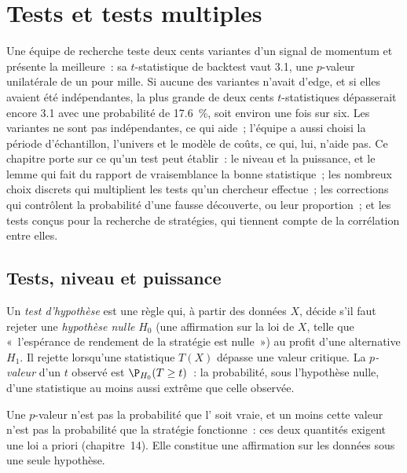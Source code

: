 \chapter{Tests et tests multiples}\label{ch:qm:testing-and-multiple-testing}

Une équipe de recherche teste deux cents variantes d'un signal de momentum et présente la meilleure~: sa $t$-statistique de backtest vaut 3.1,
une $p$-valeur unilatérale de un pour mille. Si aucune des variantes n'avait d'edge, et si elles avaient été indépendantes, la plus grande de
deux cents $t$-statistiques dépasserait encore 3.1 avec une probabilité de 17.6~\%, soit environ une fois sur six. Les variantes ne sont pas
indépendantes, ce qui aide~; l'équipe a aussi choisi la période d'échantillon, l'univers et le modèle de coûts, ce qui, lui, n'aide pas. Ce
chapitre porte sur ce qu'un test peut établir~: le niveau et la puissance, et le lemme qui fait du rapport de vraisemblance la bonne statistique~; les
nombreux choix discrets qui multiplient les tests qu'un chercheur effectue~; les corrections qui contrôlent la probabilité d'une fausse découverte,
ou leur proportion~; et les tests conçus pour la recherche de stratégies, qui tiennent compte de la corrélation entre elles.

\section{Tests, niveau et puissance}

\begin{definition}\label{def:qm:testing-and-multiple-testing:test}
Un \emph{test d'hypothèse} est une règle qui, à partir des données $X$, décide s'il faut rejeter une \emph{hypothèse
nulle} $H_0$ (une affirmation sur la loi de $X$, telle que «~l'espérance de rendement de la stratégie est nulle~») au profit
d'une alternative $H_1$. Il rejette lorsqu'une statistique $T(X)$ dépasse une valeur critique. La \emph{$p$-valeur} d'un
$t$ observé est $\P_{H_0}(T \ge t)$~: la probabilité, sous l'hypothèse nulle, d'une statistique au moins aussi extrême que celle observée.
\end{definition}

Une $p$-valeur n'est pas la probabilité que l' soit vraie, et un moins cette valeur n'est pas la probabilité que la stratégie fonctionne~:
ces deux quantités exigent une loi a priori (chapitre~14). Elle constitue une affirmation sur les données sous une seule hypothèse.

